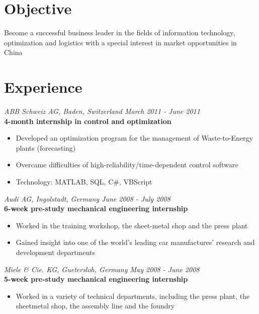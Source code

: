 \documentclass[margin]{res}
\begin{document}
 
 
 
\begin{resume} 
 
\section{Objective} 
Become a successful business leader in the fields of information technology, optimization and logistics with a special interest in market opportunities in China 
 
\section{Experience}
  {\it ABB Schweiz AG, Baden, Switzerland \hfill March 2011 - June 2011} \\
  {\bf 4-month internship in control and optimization}
  \begin{itemize} \itemsep -0.5pt 
  \item Developed an optimization program for the management of Waste-to-Energy plants (forecasting)
  \item Overcame difficulties of high-reliability/time-dependent control software
  \item Technology: MATLAB, SQL, C\#, VBScript
  \end{itemize}
  {\it Audi AG, Ingolstadt, Germany \hfill June 2008 - July 2008} \\
  {\bf 6-week pre-study mechanical engineering internship}
  \begin{itemize} \itemsep -0.5pt 
  \item Worked in the training workshop, the sheet-metal shop and the press plant
  \item Gained insight into one of the world’s leading car manufactures’ research and development departments
  \end{itemize}
  {\it Miele \& Cie. KG, Guetersloh, Germany \hfill May 2008 - June 2008} \\
  {\bf 5-week pre-study mechanical engineering internship}
  \begin{itemize} \itemsep -0.5pt
  \item Worked in a variety of technical departments, including the press plant, the sheetmetal shop, the assembly line and the foundry

\end{itemize}
\end{resume}
\end{document}
